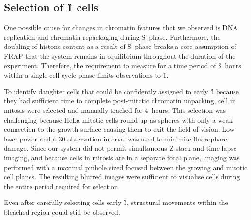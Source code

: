     \subsection{Selection of \G1{} cells}

    One possible cause for changes in chromatin features that we observed
    is DNA replication and chromatin repackaging during S~phase.
    Furthermore, the doubling of histone content as a result of S~phase breaks
    a core assumption of FRAP that the system remains in equilibrium
    throughout the duration of the experiment.
    Therefore, the requirement to measure for a time period of 8~hours
    within a single cell cycle phase limits observations to \G1{}.

    To identify daughter cells that could be confidently assigned to early \G1{}
    because they had sufficient time to complete
    post-mitotic chromatin unpacking,
    cell in mitosis were selected and manually tracked for 4~hours.
    This selection was challenging because HeLa mitotic cells round up
    as spheres with only a weak connection to the growth surface
    causing them to exit the field of vision.
    Low laser power and a \SI{30}{\min} observation interval
    was used to minimise fluorophore damage.
    Since our system did not permit simultaneous
    Z-stack and time lapse imaging,
    and because cells in mitosis are in a separate focal plane,
    imaging was performed with a maximal pinhole sized focused
    between the growing and mitotic cell planes.
    The resulting blurred images were sufficient to visualise cells during
    the entire period required for selection.

    Even after carefully selecting cells early \G1{},
    structural movements within the bleached region could
    still be observed.




